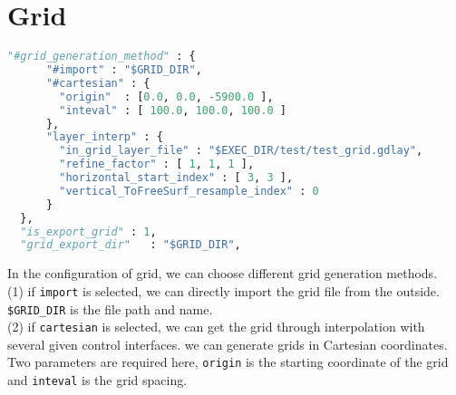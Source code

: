 \chapter{Grid}\label{chapter-grid}

\begin{lstlisting}[language=python, title=run\_test.sh, frame=tb]
  "#grid_generation_method" : {
      "#import" : "$GRID_DIR",
      "#cartesian" : {
        "origin"  : [0.0, 0.0, -5900.0 ],
        "inteval" : [ 100.0, 100.0, 100.0 ]
      },
      "layer_interp" : {
        "in_grid_layer_file" : "$EXEC_DIR/test/test_grid.gdlay",  
        "refine_factor" : [ 1, 1, 1 ],
        "horizontal_start_index" : [ 3, 3 ],
        "vertical_ToFreeSurf_resample_index" : 0
      }
  },
  "is_export_grid" : 1,
  "grid_export_dir"   : "$GRID_DIR",               
\end{lstlisting}

In the configuration of grid, we can choose different grid generation methods. \\

(1) if \texttt{import} is selected, we can directly import the grid file from the outside. \texttt{\$GRID\_DIR}  is the file path and name. \\

(2) if \texttt{cartesian} is selected, we can get the grid through interpolation with several given control interfaces. we can generate grids in Cartesian coordinates. Two parameters are required here, \texttt{origin} is the starting coordinate of the grid and \texttt{inteval} is the grid spacing. \\

